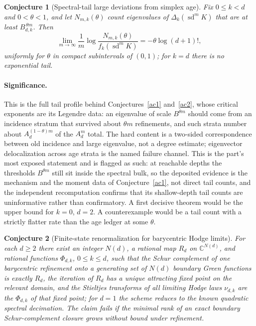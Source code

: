 \documentclass[11pt]{article}
\newtheorem{conjecture}{Conjecture}
\theoremstyle{definition}
\begin{document}
\begin{conjecture}[Spectral-tail large deviations from simplex age]\label{ac4}
Fix $0\le k<d$ and $0<\theta<1$, and let $N_{m,k}(\theta)$ count eigenvalues of $\Delta_k(\operatorname{sd}^mK)$ that are at least $B_{d,k}^{\,\theta m}$.  Then
\[
\lim_{m\to\infty}\frac1m\log\frac{N_{m,k}(\theta)}{f_k(\operatorname{sd}^mK)}=-\theta\log(d+1)!,
\]
uniformly for $\theta$ in compact subintervals of $(0,1)$; for $k=d$ there is no exponential tail.
\end{conjecture}

\paragraph{Significance.}
This is the full tail profile behind Conjectures~\ref{ac1} and~\ref{ac2}, whose critical exponents are its Legendre data: an eigenvalue of scale $B^{\theta m}$ should come from an incidence stratum that survived about $\theta m$ refinements, and such strata number about $A_d^{(1-\theta)m}$ of the $A_d^m$ total.  The hard content is a two-sided correspondence between old incidence and large eigenvalue, not a degree estimate; eigenvector delocalization across age strata is the named failure channel.  This is the part's most exposed statement and is flagged as such: at reachable depths the thresholds $B^{\theta m}$ still sit inside the spectral bulk, so the deposited evidence is the mechanism and the moment data of Conjecture~\ref{ac1}, not direct tail counts, and the independent recomputation confirms that its shallow-depth tail counts are uninformative rather than confirmatory.  A first decisive theorem would be the upper bound for $k=0$, $d=2$.  A counterexample would be a tail count with a strictly flatter rate than the age ledger at some $\theta$.

\begin{conjecture}[Finite-state renormalization for barycentric Hodge limits]\label{ac5}
For each $d\ge2$ there exist an integer $N(d)$, a rational map $R_d$ on $\mathbb C^{N(d)}$, and rational functions $\Phi_{d,k}$, $0\le k\le d$, such that the Schur complement of one barycentric refinement onto a generating set of $N(d)$ boundary Green functions is exactly $R_d$, the iteration of $R_d$ has a unique attracting fixed point on the relevant domain, and the Stieltjes transforms of all limiting Hodge laws $\nu_{d,k}$ are the $\Phi_{d,k}$ of that fixed point; for $d=1$ the scheme reduces to the known quadratic spectral decimation.  The claim fails if the minimal rank of an exact boundary Schur-complement closure grows without bound under refinement.
\end{conjecture}
\end{document}
